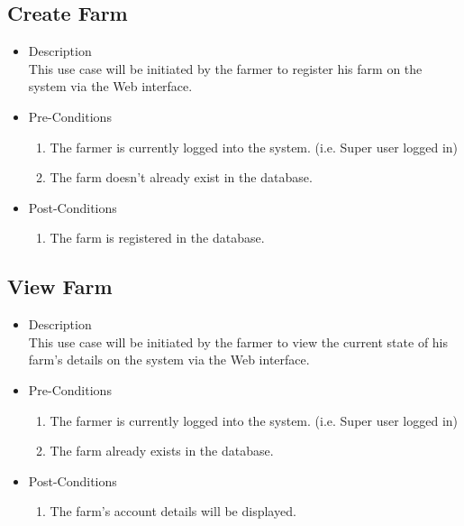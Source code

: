 \documentclass[11pt,fleqn]{book} %
\begin{document}
	\subsection{Create Farm}
	\begin{itemize}
		\item Description\\
		This use case will be initiated by the farmer to register his farm on the system via the Web interface.
		\item Pre-Conditions
		\begin{enumerate}
			\item The farmer is currently logged into the system. (i.e. Super user logged in)
			\item The farm doesn’t already exist in the database.
		\end{enumerate}
		\item Post-Conditions
		\begin{enumerate}
			\item The farm is registered in the database.
		\end{enumerate}
	\end{itemize}
	
	\subsection{View Farm}
	\begin{itemize}
		\item Description\\
		This use case will be initiated by the farmer to view the current state of his farm’s details on the system via the Web interface.
		\item Pre-Conditions
		\begin{enumerate}
			\item The farmer is currently logged into the system. (i.e. Super user logged in)
			\item The farm already exists in the database.					
		\end{enumerate}
		\item Post-Conditions
		\begin{enumerate}
			\item The farm’s account details will be displayed.
		\end{enumerate}
	\end{itemize}
	
\end{document}
